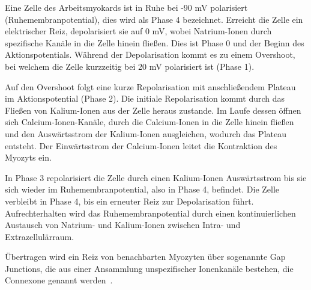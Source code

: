 Eine Zelle des Arbeitsmyokards ist in Ruhe bei -90 mV polarisiert (Ruhemembranpotential), dies wird als Phase 4 bezeichnet. Erreicht die Zelle ein elektrischer Reiz, depolarisiert sie auf 0 mV, wobei Natrium-Ionen durch spezifische Kanäle in die Zelle hinein fließen. Dies ist Phase 0 und der Beginn des Aktionspotentials. Während der Depolarisation kommt es zu einem Overshoot, bei welchem die Zelle kurzzeitig bei 20 mV polarisiert ist (Phase 1). \cite{gertsch_ekg_2007}

Auf den Overshoot folgt eine kurze Repolarisation mit anschließendem Plateau im Aktionspotential (Phase 2). Die initiale Repolarisation kommt durch das Fließen von Kalium-Ionen aus der Zelle heraus zustande. Im Laufe dessen öffnen sich Calcium-Ionen-Kanäle, durch die Calcium-Ionen in die Zelle hinein fließen und den Auswärtsstrom der Kalium-Ionen ausgleichen, wodurch das Plateau entsteht. Der Einwärtsstrom der Calcium-Ionen leitet die Kontraktion des Myozyts ein. \cite{gekle_taschenlehrbuch_2015}

In Phase 3 repolarisiert die Zelle durch einen Kalium-Ionen Auswärtsstrom  bis sie sich wieder im Ruhemembranpotential, also in Phase 4, befindet. Die Zelle verbleibt in Phase 4, bis ein erneuter Reiz zur Depolarisation führt. Aufrechterhalten wird das Ruhemembranpotential durch einen kontinuierlichen Austausch von Natrium- und Kalium-Ionen zwischen Intra- und Extrazellulärraum. \cite{gertsch_ekg_2007} 

Übertragen wird ein Reiz von benachbarten Myozyten über sogenannte Gap Junctions, die aus einer Ansammlung unspezifischer Ionenkanäle bestehen, die Connexone genannt werden~\cite{gekle_taschenlehrbuch_2015}.

